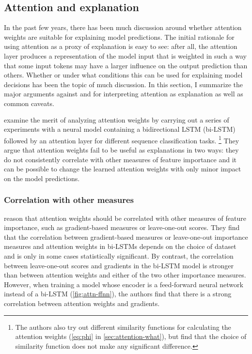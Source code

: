 \subsection{Attention and explanation}
\label{sec:attention-explanation}


In the past few years, there has been much discussion around whether attention weights are suitable for explaining model predictions.
The initial rationale for using attention as a proxy of explanation is easy to see: after all, the attention layer produces a representation of the model input that is weighted in such a way that some input tokens may have a larger influence on the output prediction than others.
Whether or under what conditions this can be used for explaining model decisions has been the topic of much discussion.
In this section, I summarize the major arguments against and for interpreting attention as explanation as well as common caveats.

\citet{jain2019attentionNotExplanation} examine the merit of analyzing attention weights by carrying out a series of experiments with a neural model containing a bidirectional LSTM (bi-LSTM) followed by an attention layer for different sequence classification tasks.%
\footnote{The authors also try out different similarity functions for calculating the attention weights (\autoref{eq:phi} in \autoref{sec:attention-what}), but find that the choice of similarity function does not make any significant difference.}
They argue that attention weights fail to be useful as explanations in two ways: they do not consistently correlate with other measures of feature importance and it can be possible to change the learned attention weights with only minor impact on the model predictions.

\subsubsection{Correlation with other measures}

\citet{jain2019attentionNotExplanation} reason that attention weights should be correlated with other measures of feature importance, such as gradient-based measures or leave-one-out scores.
They find that the correlation between gradient-based measures or leave-one-out importance measures and attention weights in bi-LSTMs depends on the choice of dataset and is only in some cases statistically significant.
By contrast, the correlation between leave-one-out scores and gradients in the bi-LSTM model is stronger than between attention weights and either of the two other importance measures.
However, when training a model whose encoder is a feed-forward neural network instead of a bi-LSTM (\autoref{fig:attn-ffnn}), the authors find that there is a strong correlation between attention weights and gradients.

